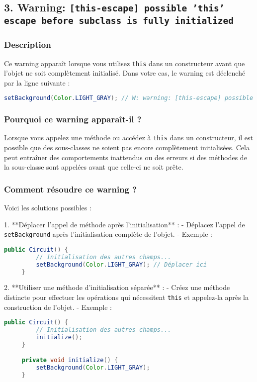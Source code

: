 \documentclass[a4paper,12pt]{article}
\begin{document}
\subsection*{3. Warning: \texttt{[this-escape] possible 'this' escape before subclass is fully initialized}}

\subsubsection*{Description}
Ce warning apparaît lorsque vous utilisez \texttt{this} dans un constructeur avant que l'objet ne soit complètement initialisé. Dans votre cas, le warning est déclenché par la ligne suivante :
\begin{lstlisting}[language=java]
setBackground(Color.LIGHT_GRAY); // W: warning: [this-escape] possible 'this' escape before subclass is fully initialized
\end{lstlisting}

\subsubsection*{Pourquoi ce warning apparaît-il ?}
Lorsque vous appelez une méthode ou accédez à \texttt{this} dans un constructeur, il est possible que des sous-classes ne soient pas encore complètement initialisées. Cela peut entraîner des comportements inattendus ou des erreurs si des méthodes de la sous-classe sont appelées avant que celle-ci ne soit prête.

\subsubsection*{Comment résoudre ce warning ?}
Voici les solutions possibles :

1. **Déplacer l'appel de méthode après l'initialisation** :
   - Déplacez l'appel de \texttt{setBackground} après l'initialisation complète de l'objet.
   - Exemple :
     \begin{lstlisting}[language=java]
     public Circuit() {
         // Initialisation des autres champs...
         setBackground(Color.LIGHT_GRAY); // Déplacer ici
     }
     \end{lstlisting}

2. **Utiliser une méthode d'initialisation séparée** :
   - Créez une méthode distincte pour effectuer les opérations qui nécessitent \texttt{this} et appelez-la après la construction de l'objet.
   - Exemple :
     \begin{lstlisting}[language=java]
     public Circuit() {
         // Initialisation des autres champs...
         initialize();
     }

     private void initialize() {
         setBackground(Color.LIGHT_GRAY);
     }
     \end{lstlisting}
\end{document}
